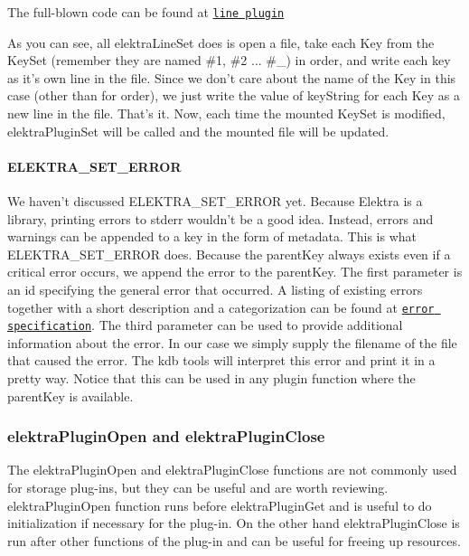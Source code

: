 The full-\/blown code can be found at \href{http://libelektra.org/tree/master/src/plugins/line/line.c}{\tt line plugin}

As you can see, all {\ttfamily elektra\+Line\+Set} does is open a file, take each Key from the Key\+Set (remember they are named {\ttfamily \#1}, {\ttfamily \#2} ... {\ttfamily \#\+\_}) in order, and write each key as it's own line in the file. Since we don't care about the name of the Key in this case (other than for order), we just write the value of {\ttfamily key\+String} for each Key as a new line in the file. That's it. Now, each time the mounted Key\+Set is modified, {\ttfamily elektra\+Plugin\+Set} will be called and the mounted file will be updated.

\paragraph*{E\+L\+E\+K\+T\+R\+A\+\_\+\+S\+E\+T\+\_\+\+E\+R\+R\+O\+R}

We haven't discussed {\ttfamily E\+L\+E\+K\+T\+R\+A\+\_\+\+S\+E\+T\+\_\+\+E\+R\+R\+O\+R} yet. Because Elektra is a library, printing errors to stderr wouldn't be a good idea. Instead, errors and warnings can be appended to a key in the form of metadata. This is what {\ttfamily E\+L\+E\+K\+T\+R\+A\+\_\+\+S\+E\+T\+\_\+\+E\+R\+R\+O\+R} does. Because the parent\+Key always exists even if a critical error occurs, we append the error to the {\ttfamily parent\+Key}. The first parameter is an id specifying the general error that occurred. A listing of existing errors together with a short description and a categorization can be found at \href{https://github.com/ElektraInitiative/libelektra/blob/master/src/error/specification}{\tt error specification}. The third parameter can be used to provide additional information about the error. In our case we simply supply the filename of the file that caused the error. The kdb tools will interpret this error and print it in a pretty way. Notice that this can be used in any plugin function where the parent\+Key is available.

\subsubsection*{elektra\+Plugin\+Open and elektra\+Plugin\+Close}

The {\ttfamily elektra\+Plugin\+Open} and {\ttfamily elektra\+Plugin\+Close} functions are not commonly used for storage plug-\/ins, but they can be useful and are worth reviewing. {\ttfamily elektra\+Plugin\+Open} function runs before {\ttfamily elektra\+Plugin\+Get} and is useful to do initialization if necessary for the plug-\/in. On the other hand {\ttfamily elektra\+Plugin\+Close} is run after other functions of the plug-\/in and can be useful for freeing up resources.

